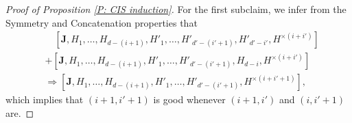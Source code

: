 \documentclass[11pt]{amsart}
\theoremstyle{definition}
\newcommand{\bJ}{{\mathbf{J}}}
\newcommand{\1}{{\mathbf{1}}}
\begin{document}
\begin{proof}[Proof of Proposition \ref{P: CIS induction}]
     For the first subclaim, we infer from the Symmetry and Concatenation properties that
	\begin{equation}\nonumber
	\begin{split}
	&\quad [\bJ, H_{1},\dots,H_{d-(i+1)},H'_{1},\dots,H'_{d'-(i'+1)},H'_{d'-i'},H^{\times (i+i')}]
	\\&+[\bJ, H_{1},\dots,H_{d-(i+1)},H'_{1},\dots,H'_{d'-(i'+1)},H_{d-i},H^{\times (i+i')}]
	\\& \Rightarrow[\bJ, H_{1},\dots,H_{d-(i+1)},H'_{1},\dots,H'_{d'-(i'+1)},H^{\times(i+i'+1)}],
	\end{split}
	\end{equation} 
	which implies that $(i+1,i'+1)$ is good whenever $(i+1,i')$ and $(i,i'+1)$ are. 
	

\end{proof}
\end{document}
